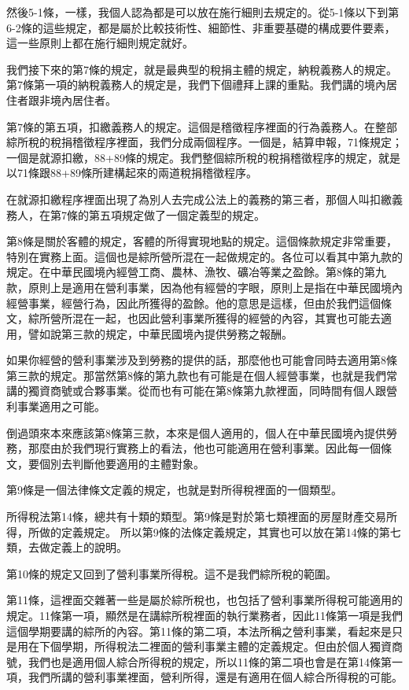 \documentclass[oneside,sub3section]{ctexbook}
\begin{document}
然後5-1條，一樣，我個人認為都是可以放在施行細則去規定的。從5-1條以下到第6-2條的這些規定，都是屬於比較技術性、細節性、非重要基礎的構成要件要素，這一些原則上都在施行細則規定就好。

我們接下來的第7條的規定，就是最典型的稅捐主體的規定，納稅義務人的規定。第7條第一項的納稅義務人的規定是，我們下個禮拜上課的重點。我們講的境內居住者跟非境內居住者。

第7條的第五項，扣繳義務人的規定。這個是稽徵程序裡面的行為義務人。在整部綜所稅的稅捐稽徵程序裡面，我們分成兩個程序。一個是，結算申報，71條規定；一個是就源扣繳，88+89條的規定。我們整個綜所稅的稅捐稽徵程序的規定，就是以71條跟88+89條所建構起來的兩道稅捐稽徵程序。

在就源扣繳程序裡面出現了為別人去完成公法上的義務的第三者，那個人叫扣繳義務人，在第7條的第五項規定做了一個定義型的規定。

第8條是關於客體的規定，客體的所得實現地點的規定。這個條款規定非常重要，特別在實務上面。這個也是綜所營所混在一起做規定的。各位可以看其中第九款的規定。在中華民國境內經營工商、農林、漁牧、礦冶等業之盈餘。第8條的第九款，原則上是適用在營利事業，因為他有經營的字眼，原則上是指在中華民國境內經營事業，經營行為，因此所獲得的盈餘。他的意思是這樣，但由於我們這個條文，綜所營所混在一起，也因此營利事業所獲得的經營的內容，其實也可能去適用，譬如說第三款的規定，中華民國境內提供勞務之報酬。

如果你經營的營利事業涉及到勞務的提供的話，那麼他也可能會同時去適用第8條第三款的規定。那當然第8條的第九款也有可能是在個人經營事業，也就是我們常講的獨資商號或合夥事業。從而也有可能在第8條第九款裡面，同時間有個人跟營利事業適用之可能。

倒過頭來本來應該第8條第三款，本來是個人適用的，個人在中華民國境內提供勞務，那麼由於我們現行實務上的看法，他也可能適用在營利事業。因此每一個條文，要個別去判斷他要適用的主體對象。

第9條是一個法律條文定義的規定，也就是對所得稅裡面的一個類型。

所得稅法第14條，總共有十類的類型。第9條是對於第七類裡面的房屋財產交易所得，所做的定義規定。
所以第9條的法條定義規定，其實也可以放在第14條的第七類，去做定義上的說明。

第10條的規定又回到了營利事業所得稅。這不是我們綜所稅的範圍。

第11條，這裡面交雜著一些是屬於綜所稅也，也包括了營利事業所得稅可能適用的規定。11條第一項，顯然是在講綜所稅裡面的執行業務者，因此11條第一項是我們這個學期要講的綜所的內容。第11條的第二項，本法所稱之營利事業，看起來是只是用在下個學期，所得稅法二裡面的營利事業主體的定義規定。但由於個人獨資商號，我們也是適用個人綜合所得稅的規定，所以11條的第二項也會是在第14條第一項，我們所講的營利事業裡面，營利所得，還是有適用在個人綜合所得稅的可能。
\end{document}
